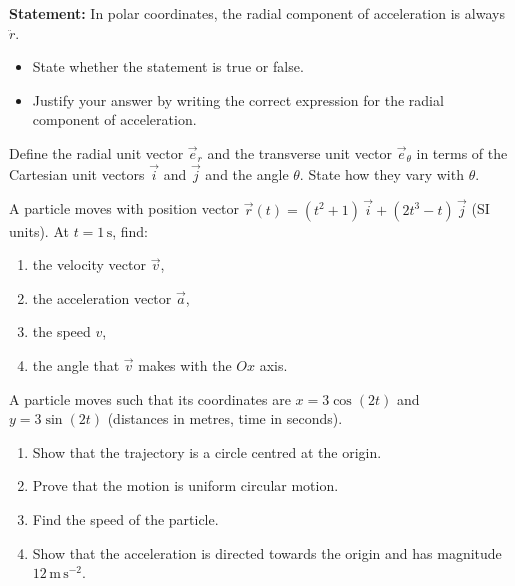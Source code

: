 \documentclass[11pt]{article}
\newcounter{popsec}
\newcounter{popsub}
\newcommand{\courssub}[1]{%
  \stepcounter{popsub}%
  \par\vspace{9pt}\noindent{\popxbold\fontsize{11.5}{13}\selectfont\color{popink}{\color{poporange}\thepopsec.\thepopsub}\hspace{6pt}#1}\par\nopagebreak\vspace{4pt}
}
\begin{document}
\begin{exercice}
\textbf{Statement:} In polar coordinates, the radial component of acceleration is always $\ddot{r}$.
\begin{itemize}
\item State whether the statement is true or false.
\item Justify your answer by writing the correct expression for the radial component of acceleration.
\end{itemize}
\end{exercice}

\begin{exercice}
Define the radial unit vector $\vec{e}_r$ and the transverse unit vector $\vec{e}_\theta$ in terms of the Cartesian unit vectors $\vec{i}$ and $\vec{j}$ and the angle $\theta$. State how they vary with $\theta$.
\end{exercice}

\begin{exercice}
A particle moves with position vector $\vec{r}(t) = (t^2 + 1)\,\vec{i} + (2t^3 - t)\,\vec{j}$ (SI units). At $t = 1\,\mathrm{s}$, find:
\begin{enumerate}
\item the velocity vector $\vec{v}$,
\item the acceleration vector $\vec{a}$,
\item the speed $v$,
\item the angle that $\vec{v}$ makes with the $Ox$ axis.
\end{enumerate}
\end{exercice}

\courssub{I practise}

\begin{exercice}
A particle moves such that its coordinates are $x = 3\cos(2t)$ and $y = 3\sin(2t)$ (distances in metres, time in seconds).
\begin{enumerate}
\item Show that the trajectory is a circle centred at the origin.
\item Prove that the motion is uniform circular motion.
\item Find the speed of the particle.
\item Show that the acceleration is directed towards the origin and has magnitude $12\,\mathrm{m\,s^{-2}}$.
\end{enumerate}
\end{exercice}
\end{document}
